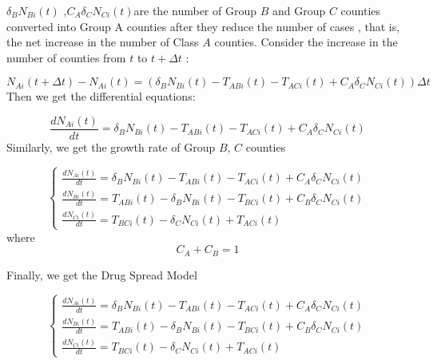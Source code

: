 \documentclass{mcmthesis}
\begin{document}
${\delta _B}{N_{Bi}}(t)$ ,${C_A}{\delta _C}{N_{Ci}}(t)$are the number of  Group $B$ and Group $C$ counties converted into Group A counties after they reduce the number of cases , that is, the net increase in the number of Class $A$ counties.  Consider the increase in the number of counties from $t$ to $t + \Delta t$ :
 
 \begin{equation}{N_{Ai}}(t + \Delta t) - {N_{Ai}}(t) = ({\delta _B}{N_{Bi}}(t) - {T_{ABi}}(t) - {T_{ACi}}(t) + {C_A}{\delta _C}{N_{Ci}}(t))\Delta t \end{equation}
Then we get the differential equations:
                
 \begin{equation}\frac{{d{N_{Ai}}(t)}}{{dt}} = {\delta _B}{N_{Bi}}(t) - {T_{ABi}}(t) - {T_{ACi}}(t) + {C_A}{\delta _C}{N_{Ci}}(t) \end{equation}
Similarly, we get the growth rate of Group $B$, $C$ counties
              
 \begin{equation}\left\{\begin{array}{l}
\frac{{d{N_{Ai}}(t)}}{{dt}} = {\delta _B}{N_{Bi}}(t) - {T_{ABi}}(t) - {T_{ACi}}(t) + {C_A}{\delta _C}{N_{Ci}}(t)\\
\frac{{d{N_{Bi}}(t)}}{{dt}} = {T_{ABi}}(t) - {\delta _B}{N_{Bi}}(t) - {T_{BCi}}(t) + {C_B}{\delta _C}{N_{Ci}}(t)\\
\frac{{d{N_{Ci}}(t)}}{{dt}} = {T_{BCi}}(t) - {\delta _C}{N_{Ci}}(t) + {T_{ACi}}(t)
\end{array}\right. \end{equation}
where
\begin{equation}
  {C_A} + {C_B} = 1
\end{equation}

Finally, we get the Drug Spread Model
 
 \begin{equation}\left\{ \begin{array}{l}
\frac{{d{N_{Ai}}(t)}}{{dt}} = {\delta _B}{N_{Bi}}(t) - {T_{ABi}}(t) - {T_{ACi}}(t) + {C_A}{\delta _C}{N_{Ci}}(t)\\
\frac{{d{N_{Bi}}(t)}}{{dt}} = {T_{ABi}}(t) - {\delta _B}{N_{Bi}}(t) - {T_{BCi}}(t) + {C_B}{\delta _C}{N_{Ci}}(t)\\
\frac{{d{N_{Ci}}(t)}}{{dt}} = {T_{BCi}}(t) - {\delta _C}{N_{Ci}}(t) + {T_{ACi}}(t)
\end{array} \right. \end{equation}
\end{document}
